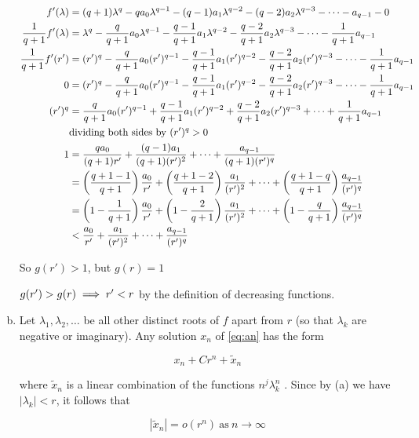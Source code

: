 \begin{theorem}
\begin{pf}
\begin{enumerate}[(a)]
$\begin{aligned}
f'(\lambda) &=(q+1)\lambda^q -qa_0\lambda^{q-1} -(q-1)a_1\lambda^{q-2} -(q-2)a_2\lambda^{q-3} -\cdots - a_{q-1}-0\\
\frac{1}{q+1}f'(\lambda) &=\lambda^q -\frac{q}{q+1}a_0\lambda^{q-1} -\frac{q-1}{q+1}a_1\lambda^{q-2} -\frac{q-2}{q+1}a_2\lambda^{q-3} -\cdots - \frac{1}{q+1}a_{q-1}\\
\frac{1}{q+1}f'(r') &=(r')^q -\frac{q}{q+1}a_0(r')^{q-1} -\frac{q-1}{q+1}a_1(r')^{q-2} -\frac{q-2}{q+1}a_2(r')^{q-3} -\cdots - \frac{1}{q+1}a_{q-1}\\
0 &=(r')^q -\frac{q}{q+1}a_0(r')^{q-1} -\frac{q-1}{q+1}a_1(r')^{q-2} -\frac{q-2}{q+1}a_2(r')^{q-3} -\cdots - \frac{1}{q+1}a_{q-1}\\
(r')^q &=\frac{q}{q+1}a_0(r')^{q-1} +\frac{q-1}{q+1}a_1(r')^{q-2} +\frac{q-2}{q+1}a_2(r')^{q-3} +\cdots + \frac{1}{q+1}a_{q-1}\\
& \text{dividing both sides by } (r')^q>0 \\
1 &= \frac{qa_0}{(q+1)r'} +\frac{(q-1)a_1}{(q+1)(r')^2} +\dots+\frac{a_{q-1}}{(q+1)(r')^q} \\
  &= \left(\frac{q+1-1}{q+1}\right)\frac{a_0}{r'} +
     \left(\frac{q+1-2}{q+1}\right)\frac{a_1}{(r')^2} +\dots+
     \left(\frac{q+1-q}{q+1}\right)\frac{a_{q-1}}{(r')^q}\\
  &= \left(1-\frac{1}{q+1}\right)\frac{a_0}{r'} +
     \left(1-\frac{2}{q+1}\right)\frac{a_1}{(r')^2} +\dots+
     \left(1-\frac{q}{q+1}\right)\frac{a_{q-1}}{(r')^q}\\
  &< \frac{a_0}{r'} +\frac{a_1}{(r')^2} +\dots+\frac{a_{q-1}}{(r')^q}
\end{aligned}$

So $g(r')>1$, but $g(r)=1$

\imp $g(r')>g(r)\implies r'<r$ by the definition of decreasing functions.

\item Let $\lambda_1, \lambda_2, \dots$ be all other distinct roots of $f$ apart from $r$ (so that $\lambda_k$ are negative or imaginary). Any solution $x_n$ of \ref{eq:an} has the form

\begin{equation} \label{eq:Crnxn}
x_n + Cr^n +\tilde{x}_n    
\end{equation}

where $\tilde{x}_n$ is a linear combination of the functions $n^j\lambda^n_k$ . Since by (a) we have $|\lambda_k| < r$, it follows that

\begin{equation} \label{eq:xnorn}
|\tilde{x}_n| = o(r^n) \ \text{as} \ n\to\infty    
\end{equation}


\end{enumerate}
\end{pf}
\end{theorem}
